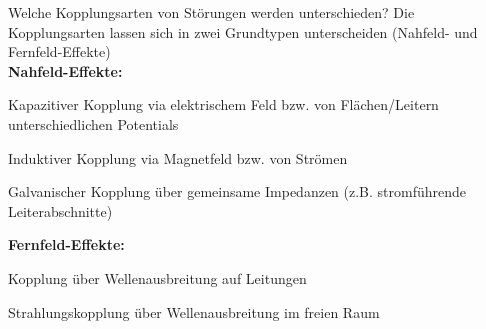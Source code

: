 
\setcounter{CardID}{41}
\begin{karte}{Welche Kopplungsarten von Störungen werden unterschieden?}
	Die Kopplungsarten lassen sich in zwei Grundtypen unterscheiden (Nahfeld- und Fernfeld-Effekte)\\[4pt]
	\textbf{Nahfeld-Effekte:}
	\begin{compactitem}
		\item Kapazitiver Kopplung via elektrischem Feld bzw. von Flächen/Leitern unterschiedlichen Potentials
		\item Induktiver Kopplung via Magnetfeld bzw. von Strömen
		\item Galvanischer Kopplung über gemeinsame Impedanzen (z.B. stromführende Leiterabschnitte)
	\end{compactitem}
	\vspace{4pt}
	\textbf{Fernfeld-Effekte:}
	\begin{compactitem}
		\item Kopplung über Wellenausbreitung auf Leitungen
		\item Strahlungskopplung über Wellenausbreitung im freien Raum
	\end{compactitem}
\end{karte}
